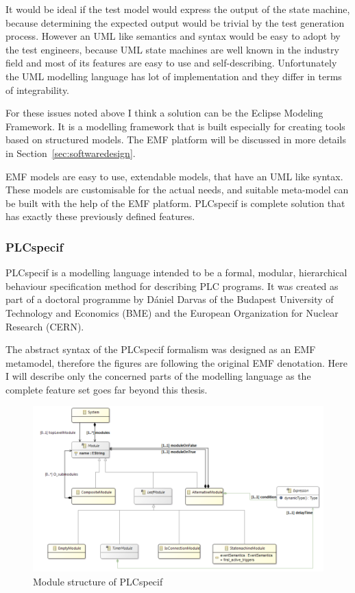 It would be ideal if the test model would express the output of the state machine, because determining the expected output would be trivial by the test generation process. However an UML like semantics and syntax would be easy to adopt by the test engineers, because UML state machines are well known in the industry field and most of its features are easy to use and self-describing. Unfortunately the UML modelling language has lot of implementation and they differ in terms of integrability.

For these issues noted above I think a solution can be the Eclipse Modeling Framework. It is a modelling framework that is built especially for creating tools based on structured models. The EMF platform will be discussed in more details in Section~\ref{sec:softwaredesign}.

EMF models are easy to use, extendable models, that have an UML like syntax.  These models are customisable for the actual needs, and suitable meta-model can be built with the help of the EMF platform. PLCspecif is complete solution that has exactly these previously defined features.

\subsubsection{PLCspecif}
\label{ssub:plcspecif}

PLCspecif \cite{plcspecif} is a modelling language intended to be a formal, modular, hierarchical behaviour specification method for describing PLC programs. It was created as part of a doctoral programme by Dániel Darvas of the Budapest University of Technology and Economics (BME) and the European Organization for Nuclear Research (CERN).

The abstract syntax of the PLCspecif formalism was designed as an EMF metamodel, therefore the figures are following the original EMF denotation. Here I will describe only the concerned parts of the modelling language as the complete feature set goes far beyond this thesis.

\begin{figure}[htp]
\centering
\includegraphics[scale=0.45]{figures/plchsm_modules}
\caption{Module structure of PLCspecif \cite{plcspecif}}
\label{fig:plchsm_modules}
\end{figure}

